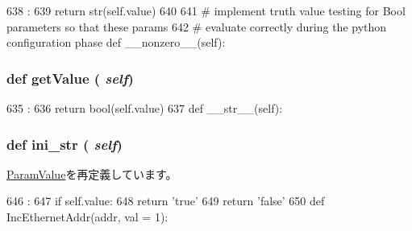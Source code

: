 \begin{DoxyCode}
638                      :
639         return str(self.value)
640 
641     # implement truth value testing for Bool parameters so that these params
642     # evaluate correctly during the python configuration phase
    def __nonzero__(self):
\end{DoxyCode}
\hypertarget{classm5_1_1params_1_1Bool_acc340fbd4335fa34f9d57fb454b28ed0}{
\subsubsection[{getValue}]{\setlength{\rightskip}{0pt plus 5cm}def getValue ( {\em self})}}
\label{classm5_1_1params_1_1Bool_acc340fbd4335fa34f9d57fb454b28ed0}



\begin{DoxyCode}
635                       :
636         return bool(self.value)
637 
    def __str__(self):
\end{DoxyCode}
\hypertarget{classm5_1_1params_1_1Bool_a33ebe6cd32bcbd15465fc28b9d94bf82}{
\subsubsection[{ini\_\-str}]{\setlength{\rightskip}{0pt plus 5cm}def ini\_\-str ( {\em self})}}
\label{classm5_1_1params_1_1Bool_a33ebe6cd32bcbd15465fc28b9d94bf82}


\hyperlink{classm5_1_1params_1_1ParamValue_a33ebe6cd32bcbd15465fc28b9d94bf82}{ParamValue}を再定義しています。


\begin{DoxyCode}
646                      :
647         if self.value:
648             return 'true'
649         return 'false'
650 
def IncEthernetAddr(addr, val = 1):
\end{DoxyCode}


